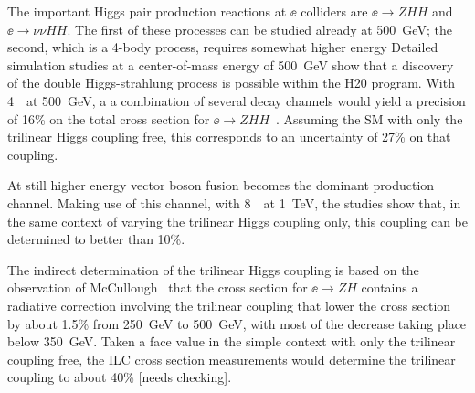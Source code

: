 The important Higgs pair production reactions at $\ee$ colliders are 
$\ee\to ZHH$ and $\ee\to \nu\bar\nu HH$.    The first of these
processes can be studied already at 500~GeV; the second, which is a
4-body process, requires
somewhat higher energy
Detailed simulation studies at a center-of-mass energy of 500~GeV show that a discovery of the
double Higgs-strahlung process is possible within the H20 program.
With 4~\iab\ at 500~GeV, a
a combination of several decay channels
would yield a precision of 16\% on the total cross section for
$\ee\to ZHH$~\cite{Duerig:2016dvi}.   Assuming the SM with only the
trilinear Higgs coupling free, this corresponds to an uncertainty of
27\% on that coupling.

At still higher energy vector boson fusion becomes the dominant
production channel. Making use of this channel, with  8~\iab\ at
1~TeV, the studies \cite{TianHHH,Roloff:2019crr} show that, in the
same context of varying the trilinear Higgs coupling only, this
coupling can be determined to better than 10\%. 



The indirect determination of the trilinear Higgs coupling is based on
the observation of McCullough~\cite{McCullough:2013rea} that the cross
section for $\ee\to ZH$ contains a radiative correction involving the
trilinear coupling that lower the cross section by about 1.5\% from
250~GeV to 500~GeV, with most of the decrease taking place below
350~GeV.  Taken a face value in the simple context with only the
trilinear coupling free, the ILC cross section measurements would determine the trilinear 
coupling to about 40\% [needs checking].

